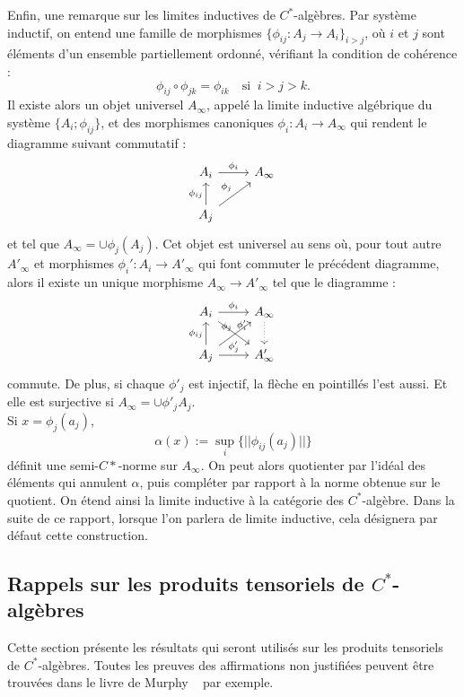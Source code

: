 Enfin, une remarque sur les limites inductives de $C^*$-algèbres. Par système inductif, on entend une famille de morphismes $\{\phi_{ij}:A_j\rightarrow A_i\}_{i>j}$, où $i$ et $j$ sont éléments d'un ensemble partiellement ordonné, vérifiant la condition de cohérence :
\[\phi_{ij}\circ\phi_{jk}=\phi_{ik}\quad \text{si }\ i>j>k.\]
Il existe alors un objet universel $A_\infty$, appelé la limite inductive algébrique du système $\{A_i; \phi_{ij}\}$, et des morphismes canoniques $\phi_i : A_i \rightarrow A_\infty$ qui rendent le diagramme suivant commutatif :
\[\begin{tikzcd} A_i \arrow{r}{\phi_i} & A_\infty \\
			A_j \arrow{ur}{\phi_j}\arrow{u}{\phi_{ij}} & 
\end{tikzcd}\]
et tel que $A_\infty = \cup \phi_j(A_j)$. Cet objet est universel au sens où, pour tout autre $A'_\infty$ et morphismes $\phi_i' : A_i\rightarrow A'_\infty$ qui font commuter le précédent diagramme, alors il existe un unique morphisme $A_\infty \rightarrow A'_\infty$ tel que le diagramme :
\[\begin{tikzcd}A_i \arrow{r}{\phi_i}\arrow{dr}{\phi'_i}& A_\infty\arrow[dotted]{d} \\
		    A_j \arrow{u}{\phi_{ij}}\arrow{ur}{\phi_j}\arrow{r}{\phi'_j}& A'_\infty
\end{tikzcd}\] 
commute. De plus, si chaque $\phi'_j$ est injectif, la flèche en pointillés l'est aussi. Et elle est surjective si $A_\infty= \cup \phi'_j A_j$. \\

Si $x=\phi_j(a_j)$,
\[\alpha(x):=\sup_i\{||\phi_{ij}(a_j)||\}\]
définit une semi-$C*$-norme sur $A_\infty$. On peut alors quotienter par l'idéal des éléments qui annulent $\alpha$, puis compléter par rapport à la norme obtenue sur le quotient. On étend ainsi la limite inductive à la catégorie des $C^*$-algèbre. Dans la suite de ce rapport, lorsque l'on parlera de limite inductive, cela désignera par défaut cette construction.
 
\subsection{Rappels sur les produits tensoriels de $C^*$-algèbres}

Cette section présente les résultats qui seront utilisés sur les produits tensoriels de $C^*$-algèbres. Toutes les preuves des affirmations non justifiées peuvent être trouvées dans le livre de Murphy ~\cite{Murphy} par exemple.\\

